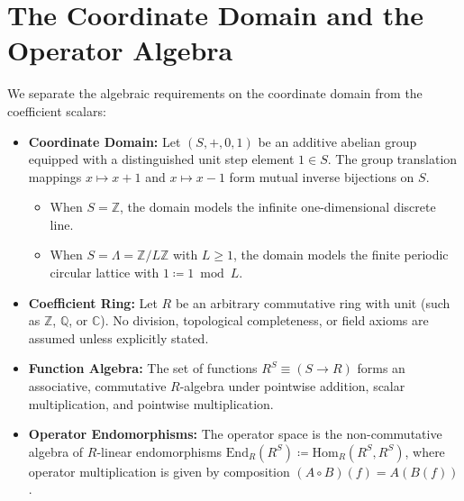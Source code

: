 \section{The Coordinate Domain and the Operator Algebra}

We separate the algebraic requirements on the coordinate domain from the coefficient scalars:
\begin{itemize}
    \item \textbf{Coordinate Domain:} Let $(S, +, 0, 1)$ be an additive abelian group equipped with a distinguished unit step element $1 \in S$. The group translation mappings $x \mapsto x + 1$ and $x \mapsto x - 1$ form mutual inverse bijections on $S$.
    \begin{itemize}
        \item When $S = \mathbb{Z}$, the domain models the infinite one-dimensional discrete line.
        \item When $S = \Lambda = \mathbb{Z}/L\mathbb{Z}$ with $L \ge 1$, the domain models the finite periodic circular lattice with $1 \coloneqq 1 \bmod L$.
    \end{itemize}
    \item \textbf{Coefficient Ring:} Let $R$ be an arbitrary commutative ring with unit (such as $\mathbb{Z}$, $\mathbb{Q}$, or $\mathbb{C}$). No division, topological completeness, or field axioms are assumed unless explicitly stated.
    \item \textbf{Function Algebra:} The set of functions $R^S \equiv (S \to R)$ forms an associative, commutative $R$-algebra under pointwise addition, scalar multiplication, and pointwise multiplication.
    \item \textbf{Operator Endomorphisms:} The operator space is the non-commutative algebra of $R$-linear endomorphisms $\mathrm{End}_R(R^S) \coloneqq \mathrm{Hom}_R(R^S, R^S)$, where operator multiplication is given by composition $(A \circ B)(f) = A(B(f))$.
\end{itemize}

